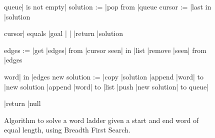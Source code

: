 \documentclass[11pt]{article} %
\begin{document}
\begin{figure}[h!!]
\caption{Algorithm to solve a word ladder given a start and end word of equal length, using Breadth First Search.}
\begin{program}
\BEGIN
\WHILE queue| is not empty|\DO
	solution := |pop from |queue 
	cursor := |last in |solution

	\IF cursor| equals |goal | |\THEN
		|return |solution 
	\FI
	
	edges := |get |edges| from |cursor
	\FOR seen| in |list \DO
		|remove |seen| from |edges 
	\OD

	\FOR word| in |edges \DO
		new solution := |copy |solution 
		|append |word| to |new solution
		|append |word| to |list 
		|push |new solution| to queue| 
	\OD

	|return |null 
\OD
\END
\end{program}
\label{fig:DiscoverAlgorithm}
\end{figure}
\end{document}
